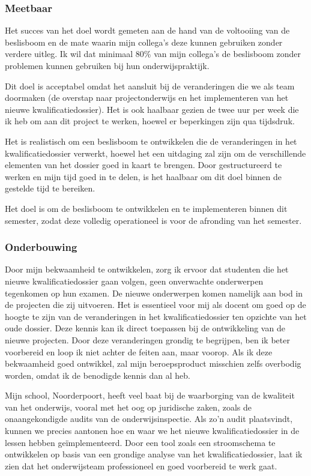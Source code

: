 \subsubsection{Meetbaar}
Het succes van het doel wordt gemeten aan de hand van de voltooiing van de beslisboom en de mate waarin mijn collega's deze kunnen gebruiken zonder verdere uitleg. Ik wil dat minimaal 80\% van mijn collega's de beslisboom zonder problemen kunnen gebruiken bij hun onderwijspraktijk.

Dit doel is acceptabel omdat het aansluit bij de veranderingen die we als team doormaken (de overstap naar projectonderwijs en het implementeren van het nieuwe kwalificatiedossier). Het is ook haalbaar gezien de twee uur per week die ik heb om aan dit project te werken, hoewel er beperkingen zijn qua tijdsdruk.

Het is realistisch om een beslisboom te ontwikkelen die de veranderingen in het kwalificatiedossier verwerkt, hoewel het een uitdaging zal zijn om de verschillende elementen van het dossier goed in kaart te brengen. Door gestructureerd te werken en mijn tijd goed in te delen, is het haalbaar om dit doel binnen de gestelde tijd te bereiken.

Het doel is om de beslisboom te ontwikkelen en te implementeren binnen dit semester, zodat deze volledig operationeel is voor de afronding van het semester.

\subsubsection{Onderbouwing}
Door mijn bekwaamheid te ontwikkelen, zorg ik ervoor dat studenten die het nieuwe kwalificatiedossier gaan volgen, geen onverwachte onderwerpen tegenkomen op hun examen. De nieuwe onderwerpen komen namelijk aan bod in de projecten die zij uitvoeren. Het is essentieel voor mij als docent om goed op de hoogte te zijn van de veranderingen in het kwalificatiedossier ten opzichte van het oude dossier. Deze kennis kan ik direct toepassen bij de ontwikkeling van de nieuwe projecten. Door deze veranderingen grondig te begrijpen, ben ik beter voorbereid en loop ik niet achter de feiten aan, maar voorop. Als ik deze bekwaamheid goed ontwikkel, zal mijn beroepsproduct misschien zelfs overbodig worden, omdat ik de benodigde kennis dan al heb.

Mijn school, Noorderpoort, heeft veel baat bij de waarborging van de kwaliteit van het onderwijs, vooral met het oog op juridische zaken, zoals de onaangekondigde audits van de onderwijsinspectie. Als zo'n audit plaatsvindt, kunnen we precies aantonen hoe en waar we het nieuwe kwalificatiedossier in de lessen hebben geïmplementeerd. Door een tool zoals een stroomschema te ontwikkelen op basis van een grondige analyse van het kwalificatiedossier, laat ik zien dat het onderwijsteam professioneel en goed voorbereid te werk gaat.

